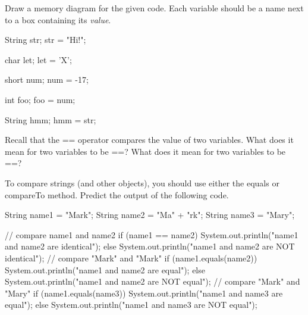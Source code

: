 \begin{answer}
\end{answer}


\Q Draw a memory diagram for the given code. Each variable should be a name next to a box containing its \emph{value}.

\begin{javalst}
String str;
str = "Hi!";

char let;
let = 'X';

short num;
num = -17;

int foo;
foo = num;

String hmm;
hmm = str;
\end{javalst}


\Q Recall that the == operator compares the value of two variables. What does it mean for two  variables to be ==? What does it mean for two  variables to be ==?

\begin{answer}
\end{answer}


\Q To compare strings (and other objects), you should use either the equals or compareTo method. Predict the output of the following code.

\begin{javalst}
String name1 = "Mark";    String name2 = "Ma" + "rk";    String name3 = "Mary";

// compare name1 and name2
if (name1 == name2) {
    System.out.println("name1 and name2 are identical");
} else {
    System.out.println("name1 and name2 are NOT identical");
}
// compare "Mark" and "Mark"
if (name1.equals(name2)) {
    System.out.println("name1 and name2 are equal");
} else {
    System.out.println("name1 and name2 are NOT equal");
}
// compare "Mark" and "Mary"
if (name1.equals(name3)) {
    System.out.println("name1 and name3 are equal");
} else {
    System.out.println("name1 and name3 are NOT equal");
}
\end{javalst}
